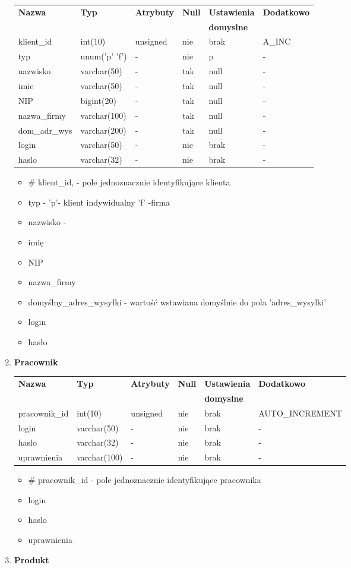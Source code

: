 \begin{enumerate}
\begin{tabular}{|l|l|l|l|l|l|} \hline
	\textbf{Nazwa} & \textbf{Typ} & \textbf{Atrybuty} & \textbf{Null} & \textbf{Ustawienia} & \textbf{Dodatkowo} \\
	&&&&\textbf{domyslne}&\\
	\hline
	klient\_id&int(10)&unsigned&nie&brak&A\_INC \\
	typ&unum('p' 'f')& - &nie& p& - \\
	nazwisko&varchar(50)&-&tak&null& - \\
	imie&varchar(50)&-&tak&null&-\\
	NIP&bigint(20)&-&tak&null&-\\
	nazwa\_firmy&varchar(100)&-&tak&null&-\\
	dom\_adr\_wys&varchar(200)&-&tak&null&-\\
	login&varchar(50)&-&nie&brak&-\\
	haslo&varchar(32)&-&nie&brak&-\\
	\hline
\end{tabular}
\begin{itemize}
	\item \# klient\_id, - pole jednoznacznie identyfikujące klienta
	\item typ - 'p'- klient indywidualny 'f' -firma
	\item nazwisko -
	\item imię 
	\item NIP 
	\item nazwa\_firmy 
	\item domyślny\_adres\_wysyłki - wartość wstawiana domyślnie do pola 'adres\_wysylki'
	\item login 
	\item hasło
	\end{itemize}
\item \textbf{Pracownik}

\begin{tabular}{|l|l|l|l|l|l|} \hline
	\textbf{Nazwa} & \textbf{Typ} & \textbf{Atrybuty} & \textbf{Null} & \textbf{Ustawienia} & \textbf{Dodatkowo} \\
	&&&&\textbf{domyslne}&\\
	\hline
	pracownik\_id&int(10)&unsigned&nie&brak&AUTO\_INCREMENT \\
	login&varchar(50)&-&nie&brak&-\\
	haslo&varchar(32)&-&nie&brak&-\\
	uprawnienia&varchar(100)&-&nie&brak&-\\
	\hline
\end{tabular}
\begin{itemize}
	\item \# pracownik\_id - pole jednoznacznie identyfikujące pracownika
	\item login
	\item haslo
	\item uprawnienia	
	\end{itemize} 
\item \textbf{Produkt}


\end{enumerate}
